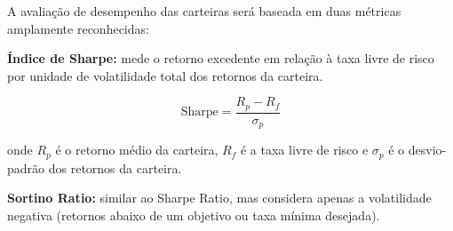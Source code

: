A avaliação de desempenho das carteiras será baseada em duas métricas amplamente reconhecidas:

\textbf{Índice de Sharpe:} mede o retorno excedente em relação à taxa livre de risco por unidade de volatilidade total dos retornos da carteira.

\begin{equation}
\label{eq:sharpe_ratio}
\text{Sharpe} = \frac{R_p - R_f}{\sigma_p}
\end{equation}

onde $R_p$ é o retorno médio da carteira, $R_f$ é a taxa livre de risco e $\sigma_p$ é o desvio-padrão dos retornos da carteira.

\textbf{Sortino Ratio:} similar ao Sharpe Ratio, mas considera apenas a volatilidade negativa (retornos abaixo de um objetivo ou taxa mínima desejada).


